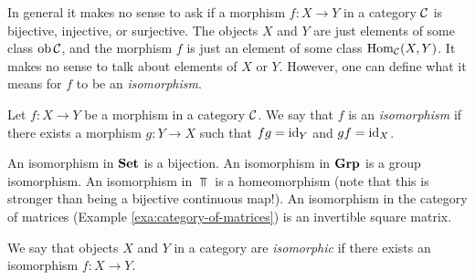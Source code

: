In general it makes no sense to ask if a morphism $f\colon X\to Y$ in a category ${\mathcal{C}}$ is bijective, injective, or surjective. The objects $X$ and $Y$ are just elements of some class $\operatorname{ob} {\mathcal{C}}$, and the morphism $f$ is just an element of some class $\operatorname{Hom}_{\mathcal{C}}(X,Y)$.  It makes no sense to talk about elements of $X$ or $Y$. However, one can define what it means for $f$ to be an \emph{isomorphism}.


\begin{definition}Let $f\colon X\to Y$ be a morphism in a category ${\mathcal{C}}$. We say that $f$ is an \emph{isomorphism} if there exists a morphism $g\colon Y \to X$ such that $fg={\rm id}_Y$ and $gf={\rm id}_X$.
\end{definition}

\begin{example}An isomorphism in $\mathbf{Set}$ is a bijection. An isomorphism in $\mathbf{Grp}$ is a group isomorphism. An isomorphism in $\Top$ is a homeomorphism (note that this is stronger than being a bijective continuous map!). An isomorphism in the category of matrices (Example \ref{exa:category-of-matrices}) is an invertible square matrix.
\end{example}

\begin{definition}We say that objects $X$ and $Y$ in a category are \emph{isomorphic} if there exists an isomorphism $f\colon X\to Y$.
\end{definition}

